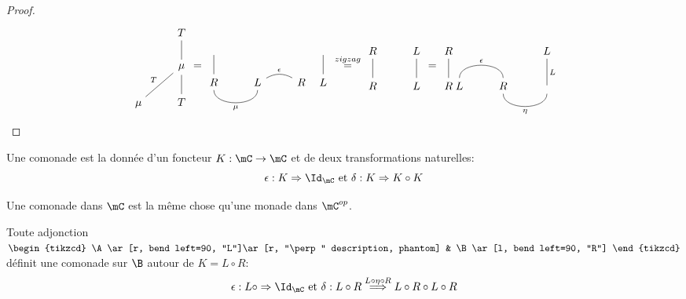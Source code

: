 \documentclass[math, info]{cours}
\begin{document}
\begin{proof}
\begin{equation*}
\begin{tikzcd}
			&T\\
			&|[alias=mu]|\mu\ar[u, no head]\\
			|[alias=mu2]|\mu\ar[ur, "T", no head] & T\ar[u, no head]
		\end{tikzcd}
		=
		\begin{tikzcd}
			\phantom{} & & &[-20pt] \phantom{}\\
			R\ar[u, no head]\ar[r, bend right=90, no head, "\mu"'] & L\ar[r, bend left, "\epsilon", no head] & R & L\ar[u, no head]
		\end{tikzcd}
		\overset{zigzag}{=}
		\begin{tikzcd}
			R & L\\
			R\ar[u, no head] & L\ar[u, no head]
		\end{tikzcd}
		=
		\begin{tikzcd}
			R &[-30pt] & & L\\
			R\ar[u, no head] & L\ar[r, "\epsilon", bend left=90, no head] & R & \phantom{}\ar[u, no head, "L"']\ar[l, bend left=90, "\eta", no head]
		\end{tikzcd}
	\end{equation*}
\end{proof}

\begin{definition}
	Une comonade est la donnée d'un foncteur $K: \mC \to \mC$ et de deux transformations naturelles:
	\begin{equation*}
		\epsilon: K \Rightarrow \Id_{\mC} \text{ et } \delta: K \Rightarrow K\circ K
	\end{equation*}
\end{definition}
\begin{remarque}
	Une comonade dans $\mC$ est la même chose qu'une monade dans $\mC^{op}$.
\end{remarque}

\begin{proposition}
	Toute adjonction $\begin{tikzcd}
		\A\ar[r, bend left=90, "L"]\ar[r, "\perp" description, phantom] & \B\ar[l, bend left=90, "R"]
	\end{tikzcd}$
	définit une comonade sur $\B$ autour de $K = L \circ R$:
	\begin{equation*}
		\epsilon: L\circ \Rightarrow\Id_{\mC} \text{ et } \delta: L\circ R \overset{L \circ \eta\circ R}{\Longrightarrow} L\circ R \circ L \circ R
	\end{equation*}
\end{proposition}
\end{document}

